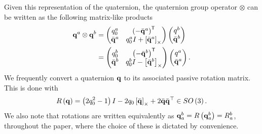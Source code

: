 Given this representation of the quaternion, the quaternion group operator
$\otimes$ can be written as the following matrix-like products
\begin{align}
  \boldsymbol{\mathrm{q}}^a \otimes \boldsymbol{\mathrm{q}}^b &= \begin{pmatrix} q_0^a & \left(-\bar{\boldsymbol{\mathrm{q}}}^{a}\right)^{\mathsf{T}} \\ \bar{\boldsymbol{\mathrm{q}}}^a & q^a_0 I + \left[ \bar{\boldsymbol{\mathrm{q}}}^a \right]_{\times} \end{pmatrix}
	\begin{pmatrix} q^b \\ \bar{\boldsymbol{\mathrm{q}}}^b\end{pmatrix}
  \label{eq:quat_otimes_product1} \\
  &= \begin{pmatrix} q_0^b & \left(-\bar{\boldsymbol{\mathrm{q}}}^{b}\right)^{\mathsf{T}} \\ \bar{\boldsymbol{\mathrm{q}}}^b & q^b_0 I - \left[ \bar{\boldsymbol{\mathrm{q}}}^b \right]_{\times} \end{pmatrix}
	\begin{pmatrix} q^a \\ \bar{\boldsymbol{\mathrm{q}}}^a \end{pmatrix}.
  \label{eq:quat_otimes_product2}
\end{align}
We frequently convert a quaternion $\boldsymbol{\mathrm{q}}$ to its associated passive rotation
matrix. This is done with
\begin{equation}
R\left(\boldsymbol{\mathrm{q}}\right)=\left(2q_{0}^{2}-1\right)I-2q_{0}\left[ \bar{\boldsymbol{\mathrm{q}}} \right]_{\times}+2\bar{\boldsymbol{\mathrm{q}}}\bar{\boldsymbol{\mathrm{q}}}^{\top}\in SO\left(3\right).
\label{eq:est_paper_R_from_q}
\end{equation}
We also note that rotations are written equivalently as
$\boldsymbol{\mathrm{q}}_a^b=R\left(\boldsymbol{\mathrm{q}}_a^b\right)=R_a^b$, throughout the paper, where the choice of these is dictated by convenience.

